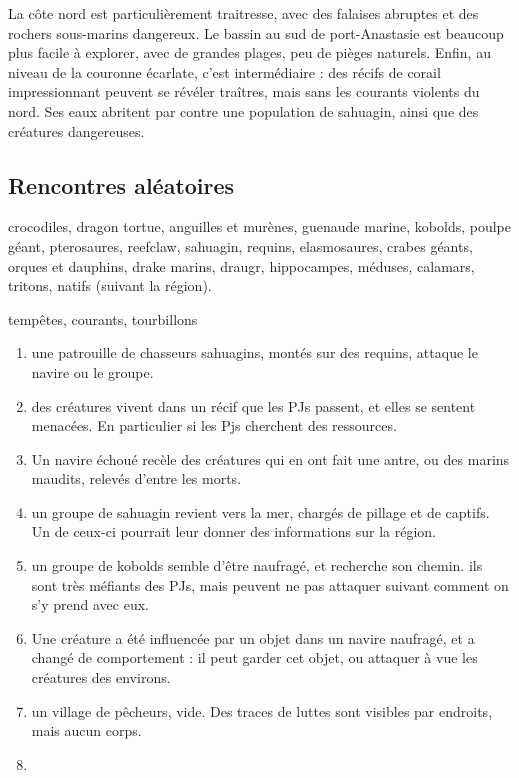 \documentclass[10pt,a4paper]{book}
\begin{document}
La côte nord est particulièrement traitresse, avec des falaises abruptes et des rochers sous-marins dangereux. Le bassin au sud de port-Anastasie est beaucoup plus facile à explorer, avec de grandes plages, peu de pièges naturels. Enfin, au niveau de la couronne écarlate, c'est intermédiaire : des récifs de corail impressionnant peuvent se révéler traîtres, mais sans les courants violents du nord. Ses eaux abritent par contre une population de sahuagin, ainsi que des créatures dangereuses.


\subsection{Rencontres aléatoires}
crocodiles, dragon tortue, anguilles et murènes, guenaude marine, kobolds,  poulpe géant, pterosaures, reefclaw, sahuagin, requins, elasmosaures, crabes géants, orques et dauphins, drake marins, draugr, hippocampes, méduses, calamars, tritons, natifs (suivant la région).

tempêtes, courants, tourbillons
\begin{enumerate}
\item une patrouille de chasseurs sahuagins, montés sur des requins, attaque le navire ou le groupe.
\item des créatures vivent dans un récif que les PJs passent, et elles se sentent menacées. En particulier si les Pjs cherchent des ressources.
\item Un navire échoué recèle des créatures qui en ont fait une antre, ou des marins maudits, relevés d'entre les morts.
\item un groupe de sahuagin revient vers la mer, chargés de pillage et de captifs. Un de ceux-ci pourrait leur donner des informations sur la région.
\item un groupe de kobolds semble d'être naufragé, et recherche son chemin. ils sont très méfiants des PJs, mais peuvent ne pas attaquer suivant comment on s'y prend avec eux.
\item Une créature a été influencée par un objet dans un navire naufragé, et a changé de comportement : il peut garder cet objet, ou attaquer à vue les créatures des environs.
\item un village de pêcheurs, vide. Des traces de luttes sont visibles par endroits, mais aucun corps.
\item 
\end{enumerate}
\end{document}
